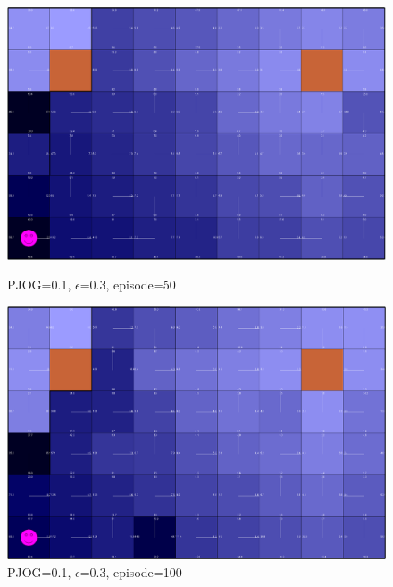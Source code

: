 \documentclass[11pt]{article}
\begin{document}
\begin{figure}[!htb]
   \begin{minipage}{0.34\textwidth}
     \centering
     \includegraphics[width=1.2\linewidth]{../figures/q1_3_50.png}
     \caption{PJOG=0.1, $\epsilon$=0.3, episode=50}\label{Fig:q1_3_50}
   \end{minipage}\hfill
   \begin{minipage}{0.34\textwidth}
     \centering
     \includegraphics[width=1.2\linewidth]{../figures/q1_3_100.png}
     \caption{PJOG=0.1, $\epsilon$=0.3, episode=100}\label{Fig:q1_3_100}
   \end{minipage}
\end{figure}
\end{document}
